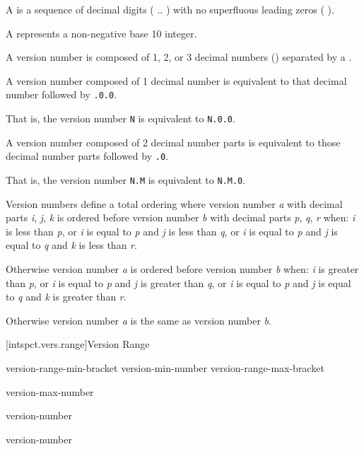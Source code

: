 \pnum
A  is a sequence of decimal digits
( ..  )
with no superfluous leading zeros ( ).

\pnum
A  represents a non-negative base 10 integer.

\pnum
A version number is composed of 1, 2, or 3 decimal numbers
() separated by a  .

\pnum
A version number composed of 1 decimal number is equivalent to that decimal
number followed by \verb|.0.0|.

\begin{note}
That is, the version number \verb|N| is equivalent to \verb|N.0.0|.
\end{note}

\pnum
A version number composed of 2 decimal number parts is equivalent to those
decimal number parts followed by \verb|.0|.

\begin{note}
That is, the version number \verb|N.M| is equivalent to \verb|N.M.0|.
\end{note}

\pnum
Version numbers define a total ordering where version number \emph{a} with
decimal parts \emph{i}, \emph{j}, \emph{k} is ordered before version number
\emph{b} with decimal parts \emph{p}, \emph{q}, \emph{r} when: \emph{i} is less
than \emph{p}, or \emph{i} is equal to \emph{p} and \emph{j} is less than
\emph{q}, or \emph{i} is equal to \emph{p} and \emph{j} is equal to \emph{q} and
\emph{k} is less than \emph{r}.

\pnum
Otherwise version number \emph{a} is ordered before version number \emph{b}
when: \emph{i} is greater than \emph{p}, or \emph{i} is equal to \emph{p} and
\emph{j} is greater than \emph{q}, or \emph{i} is equal to \emph{p} and
\emph{j} is equal to \emph{q} and \emph{k} is greater than \emph{r}.

\pnum
Otherwise version number \emph{a} is the same as version number \emph{b}.

[intspct.vers.range]{Version Range}

\pnum
\begin{ncbnf}

\br
	version-range-min-bracket
	version-min-number 
	version-range-max-bracket

\br
	  version-max-number

\br
	version-number

\br
	version-number

\br
	 
	 

\br
	 
	 

\end{ncbnf}


